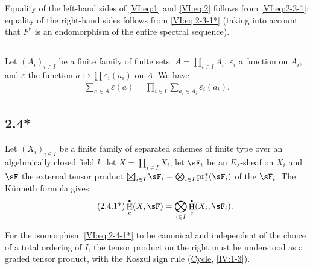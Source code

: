 \documentclass[oneside]{book}
\DeclareMathOperator{\h}{H}
\newcommand{\pr}{\mathrm{pr}} %
\theoremstyle{sga-source}
\theoremstyle{sga-source-dash}
\theoremstyle{sga-source-dotdash}
\theoremstyle{sga-source-number-note-dash}
\theoremstyle{sga-source-note-number-dotdash}
\theoremstyle{sga-source-example-dotdash}
\theoremstyle{sga-source-inline-number}
\theoremstyle{sga-source-bare-number}
\theoremstyle{sga-source}
\newcommand{\bigboxtimes}{\mathop{\vphantom{\sum}\mathchoice
  {\vcenter{\hbox{\huge $\boxtimes$}}}
  {\vcenter{\hbox{\Large $\boxtimes$}}}{\boxtimes}{\boxtimes}}\displaylimits}
\let\oldbullet\bullet
\renewcommand{\bullet}{\textnormal{\tiny$\oldbullet$}}
\begin{document}
Equality of the left-hand sides of \eqref{VI:eq:1} and \eqref{VI:eq:2} 
follows from \eqref{VI:eq:2-3-1}; equality of the right-hand sides follows from 
\eqref{VI:eq:2-3-1*} (taking into account that $F^\ast$ is an endomorphism of 
the entire spectral sequence). 





\subsection{}\label{VI:2-4}

Let $(A_i)_{i\in I}$ be a finite family of finite sets, 
$A=\prod_{i\in I} A_i$, $\varepsilon_i$ a function on $A_i$, and 
$\varepsilon$ the function $a\mapsto \prod \varepsilon_i(a_i)$ on $A$. We have 
\begin{align*}\tag{2.4.1}\label{VI:eq:2-4-1}
  \sum_{a\in A} \varepsilon(a) = \prod_{i\in I} \sum_{a_i\in A_i} \varepsilon_i(a_i) \text{.}
\end{align*}





\subsection*{2.4*}\label{VI:2-4*}

Let $(X_i)_{i\in I}$ be a finite family of separated schemes of finite type 
over an algebraically closed field $k$, let $X=\prod_{i\in I} X_i$, let $\sF_i$ be an 
$E_\lambda$-sheaf on $X_i$ and $\sF$ the external tensor product 
$\bigboxtimes_{i\in I}\sF_i = \bigotimes_{i\in I} \pr_i^\ast(\sF_i)$ 
of the $\sF_i$. 
The K\"unneth formula gives 
\begin{align*}\tag{2.4.1*}\label{VI:eq:2-4-1*}
  \h_c^\bullet(X,\sF) = \bigotimes_{i\in I} \h_c^\bullet(X_i,\sF_i) \text{.}
\end{align*}

For the isomorphism \eqref{VI:eq:2-4-1*} to be canonical and independent of 
the choice of a total ordering of $I$, the tensor product on the right must be 
understood as a graded tensor product, with the Koszul sign rule 
(\hyperref[IV]{Cycle}, \ref{IV:1-3}). 





\subsection{}\label{VI:2-5}
\end{document}
